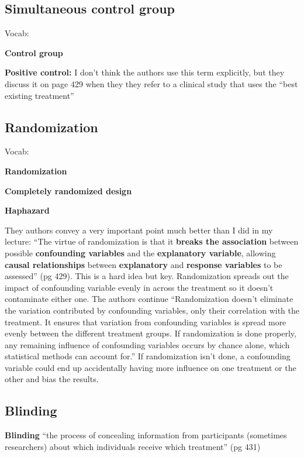 \documentclass[]{book}
\theoremstyle{definition}
\theoremstyle{definition}
\theoremstyle{definition}
\theoremstyle{remark}
\begin{document}
\subsection{Simultaneous control
group}\label{simultaneous-control-group}

Vocab:

\textbf{Control group}

\textbf{Positive control:} I don't think the authors use this term
explicitly, but they discuss it on page 429 when they they refer to a
clinical study that uses the ``best existing treatment''

\subsection{Randomization}\label{randomization}

Vocab:

\textbf{Randomization}

\textbf{Completely randomized design}

\textbf{Haphazard}

They authors convey a very important point much better than I did in my
lecture: ``The virtue of randomization is that it \textbf{breaks the
association} between possible \textbf{confounding variables} and the
\textbf{explanatory variable}, allowing \textbf{causal relationships}
between \textbf{explanatory} and \textbf{response variables} to be
assessed'' (pg 429). This is a hard idea but key. Randomization spreads
out the impact of confounding variable evenly in across the treatment so
it doesn't contaminate either one. The authors continue ``Randomization
doesn't eliminate the variation contributed by confounding variables,
only their correlation with the treatment. It ensures that variation
from confounding variables is spread more evenly between the different
treatment groups. If randomization is done properly, any remaining
influence of confounding variables occurs by chance alone, which
statistical methods can account for.'' If randomization isn't done, a
confounding variable could end up accidentally having more influence on
one treatment or the other and bias the results.

\subsection{Blinding}\label{blinding}

\textbf{Blinding} ``the process of concealing information from
participants (sometimes researchers) about which individuals receive
which treatment'' (pg 431)
\end{document}
